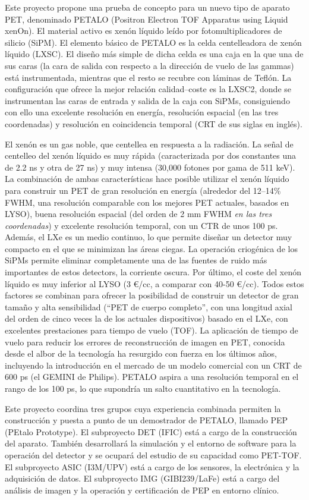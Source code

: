 Este proyecto propone una prueba de concepto para un nuevo tipo de aparato PET, denominado PETALO (Positron Electron TOF Apparatus using Liquid xenOn). El material activo es xenón líquido leído por fotomultiplicadores de silicio (SiPM). El elemento básico de PETALO es la celda centelleadora de xenón líquido (LXSC).  El diseño más simple de dicha celda es una caja en la que una de sus caras (la cara de salida con respecto a la dirección de vuelo de las gammas) está instrumentada, mientras que el resto se recubre con láminas de Teflón. La configuración que ofrece la mejor relación calidad--coste es la LXSC2, donde se instrumentan las caras de entrada y salida de la caja con SiPMs, consiguiendo con ello una excelente resolución en energía, resolución espacial (en las tres coordenadas) y resolución en coincidencia temporal (CRT de sus siglas en inglés). 

El xenón es un gas noble, que centellea en respuesta a la radiación. La señal de centelleo del xenón líquido es muy rápida (caracterizada por dos constantes una de 2.2 ns y otra de 27 ns) y muy intensa (30,000 fotones por gama de 511 keV). La combinación de ambas características hace posible utilizar el xenón líquido para construir un PET de gran resolución en energía (alrededor del 12--14\% FWHM, una resolución comparable con los mejores PET actuales, basados en LYSO), buena resolución espacial (del orden de 2 mm FWHM {\em en las tres coordenadas}) y excelente resolución temporal, con un CTR de unos 100 ps. Además, el LXe es un medio continuo, lo que permite diseñar un detector muy compacto en el que se minimizan las áreas ciegas. La operación criogénica de los SiPMs permite eliminar completamente una de las fuentes de ruido más importantes de estos detectors, la corriente oscura. Por último, el coste del xenón líquido es muy inferior al LYSO (3 \euro/cc, a comparar con 40-50 \euro/cc). Todos estos factores se combinan para ofrecer la posibilidad de construir un detector de gran tamaño y alta sensibilidad (``PET de cuerpo completo'', con una longitud axial del orden de cinco veces la de los actuales dispositivos) basado en el LXe, con excelentes prestaciones para tiempo de vuelo (TOF).  La aplicación de tiempo de vuelo para reducir los errores de reconstrucción de imagen en PET, conocida desde el albor de la tecnología ha resurgido con fuerza en los últimos años, incluyendo la introducción en el mercado de un modelo comercial con un CRT de 600 ps (el GEMINI de Philips). PETALO aspira a una resolución temporal en el rango de los 100 ps, lo que supondría un salto cuantitativo en la tecnología.

Este proyecto coordina tres grupos cuya experiencia combinada permiten la construcción y puesta a punto de un demostrador de PETALO, llamado PEP (PEtalo Prototype). El subproyecto DET (IFIC) está a cargo de la construcción del aparato. También desarrollará la simulación y el entorno de software para la operación del detector y se ocupará del estudio de su capacidad como PET-TOF. El subproyecto ASIC (I3M/UPV) está a cargo de los sensores, la electrónica y la adquisición de datos.  El subproyecto IMG (GIBI239/LaFe) está a cargo del análisis de imagen y la operación y certificación de PEP en entorno clínico. 



